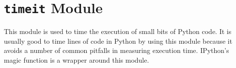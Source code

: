 \begin{comment}
\section*{\texttt{pickle} Module}
The \li{pickle} module saves a Python object to a file.
It can also take the file and turn it back into a Python object.
Pickle can be used to store any built-in Python data type such as lists, tuple, integers, etc.
Not all Python objects can be pickled.
Here is an example of saving an object to a file.
\begin{lstlisting}
import pickle
a = range(10)
pickle.dump(a, open(`out.pkl', `w'))
\end{lstlisting}
When given an object, the \li{pickle} module outputs a small program that will rebuild the object later.
When unpickling a file, pickle executes this file in the interpreter.
Because of this, pickle is meant to be used as a temporary storage and data persistence mechanism.
It is not designed to be used for long term storage of data.
The pickle documentation includes this warning
\begin{quote}
\textbf{The pickle module is not intended to be secure against erroneous or maliciously constructed data.
Never unpickle data received from an untrusted or unauthenticated source.}
\end{quote}
To unpickle an object, use \li{pickle.load()}.
It accepts a file handle and returns the Python object it creates.

\begin{problem}
Create a list of numbers and strings.
Pickle the object to a file.
Inspect the contents of the file you created when pickling.
Unpickle the object.
\end{problem}

The \li{pickle} module only allows you to store one object per file.
If you want to store many objects, you should consider the \li{shelve} module.
This stores objects in a dictionary-like data structure with keys and values.
The values are pickled objects.
Since \li{shelve} relies on \li{pickle}, the same warning against untrusted sources applies to \li{shelve} as well.
\end{comment}

\section*{\texttt{timeit} Module}
This module is used to time the execution of small bits of Python code.
It is usually good to time lines of code in Python by using this module because it avoids a number of common pitfalls in measuring execution time.
IPython's  magic function is a wrapper around this module.

